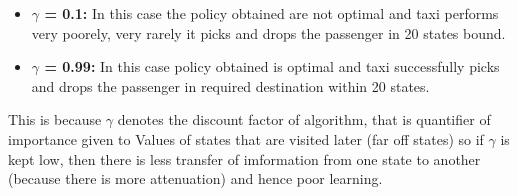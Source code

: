 \documentclass{article}
\begin{document}
\begin{enumerate}[a)]
    \begin{itemize}
        \item \textbf{$\gamma$ = 0.1: } In this case the policy obtained are not optimal and taxi performs very poorely, very rarely it picks and drops the passenger in 20 states bound.
        \item \textbf{$\gamma$ = 0.99: } In this case policy obtained is optimal and taxi successfully picks and drops the passenger in required destination within 20 states.
    \end{itemize}

    This is because $\gamma$ denotes the discount factor of algorithm, that is quantifier of importance given to Values of states that are visited later (far off states) so if $\gamma$ is kept low, then there is less transfer of imformation from one state to another (because there is more attenuation) and hence poor learning.

\end{enumerate}
\end{document}
